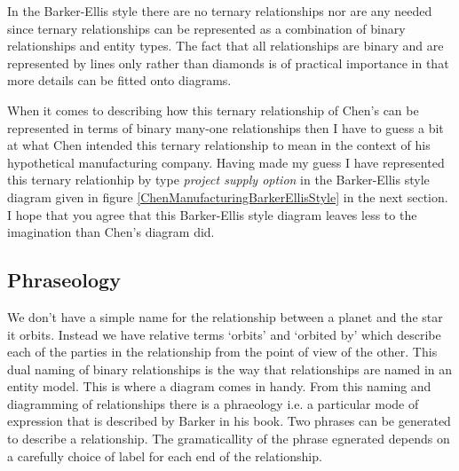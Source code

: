 In the Barker-Ellis style there are no ternary relationships nor are any needed since ternary relationships can be represented as a combination of binary relationships and entity types. The fact that all relationships are binary and are represented by lines only rather than diamonds  is of practical importance in that more details can be fitted onto diagrams.

\mynote
When it comes to describing how this ternary relationship of Chen's can be represented in terms of binary many-one relationships then I have to guess a bit at what Chen intended this ternary relationship to mean in the context of his hypothetical manufacturing company. 
Having made my guess I have represented this ternary relationhip by type \textit{project supply option} 
in the Barker-Ellis style diagram given  in figure \ref{ChenManufacturingBarkerEllisStyle} in the next section. I hope that you agree that this Barker-Ellis style diagram leaves less to the imagination than Chen's diagram did. 

\subsection*{Phraseology}
\mynote 
We don't have a simple name for the relationship between a planet and the star it orbits. Instead we have  relative terms `orbits' and `orbited by' which describe each of the parties in the relationship from the point of view of the other. This dual naming of binary relationships is the way that relationships are named in an entity model. 
This is where a diagram comes in handy. 
\mynote
From this naming and diagramming of relationships there is a phraeology i.e. a particular mode of expression that is described by Barker in his book. Two phrases can be generated to describe a relationship. The gramaticallity of the phrase egnerated depends on a carefully choice of label for each end of the relationship. 

